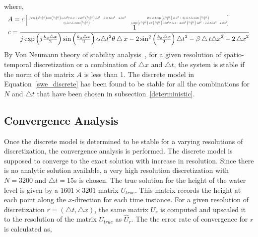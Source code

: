 \noindent where, 
\begin{equation}
\begin{array}{l} 
A = c \resizebox{.9 \textwidth}{!}  { $ \begin{bmatrix}
-j\exp\left( j \frac{k_x \bigtriangleup x}{2} \right) \sin \left( \frac{k_x \bigtriangleup x}{2} \right) \alpha {\bigtriangleup t}^{2}\theta \bigtriangleup x
+ 2 \sin^2 \left( \frac{k_x \bigtriangleup x}{2} \right) {\bigtriangleup t}^{2} - \beta \bigtriangleup t{ \bigtriangleup x}^{2} - 2\,{ \bigtriangleup x}^{2} &  
2 \theta \alpha \bigtriangleup t \exp\left( j \frac{k_x \bigtriangleup x}{2} \right) \bigtriangleup x^2 + 4j \bigtriangleup t  \bigtriangleup x  \sin \left( \frac{k_x \bigtriangleup x}{2} \right)\\
4j \bigtriangleup t  \bigtriangleup x  \sin \left( \frac{k_x \bigtriangleup x}{2} \right) & 
-j\exp\left( j \frac{k_x \bigtriangleup x}{2} \right) \sin \left( \frac{k_x \bigtriangleup x}{2} \right) \alpha {\bigtriangleup t}^{2}\theta \bigtriangleup x  +  2 \sin^2 \left( \frac{k_x \bigtriangleup x}{2} \right) {\bigtriangleup t}^{2} + \beta \bigtriangleup t{ \bigtriangleup x}^{2} - 2\,{ \bigtriangleup x}^{2}
\end{bmatrix}$  } \\
c = \displaystyle \frac{1}{j\exp\left( j \frac{k_x \bigtriangleup x}{2} \right) \sin \left( \frac{k_x \bigtriangleup x}{2} \right) \alpha {\bigtriangleup t}^{2}\theta \bigtriangleup x
-2 \sin^2 \left( \frac{k_x \bigtriangleup x}{2} \right) {\bigtriangleup t}^{2}-\beta \bigtriangleup t{ \bigtriangleup x}^{2}-2\,{ \bigtriangleup x}^{2}
} 
\end{array} 
\end{equation}
By Von Neumann theory of stability analysis~\cite{charney1950numerical}, for a given resolution of spatio-temporal discretization or a combination of  $\bigtriangleup x$ and $\bigtriangleup t$, the system is stable if the norm of the matrix $A$ is less than 1. The discrete model in Equation~\ref{swe_discrete} has been found to be stable for all the combinations for $N$ and $\bigtriangleup t$ that have been chosen in subsection~\ref{deterministic}. 

\subsection{Convergence Analysis}

Once the discrete model is determined to be stable for a varying resolutions of discretization, the convergence analysis is performed. The discrete model is supposed to converge to the exact solution with increase in resolution. Since there is no analytic solution available, a very high resolution discretization with $N = 3200$ and $\bigtriangleup t = 15$s is chosen. The true solution for the height of the water level is given by a  $1601 \times 3201$  matrix $U_{true}$. This matrix records the height at each point along the $x$-direction for each time instance.  For a given resolution of discretization $r = (\bigtriangleup t, \bigtriangleup x)$, the same matrix $U_r$ is computed and upscaled it to the resolution of the matrix $U_{true}$ as $\hat{U}_r$. The the error rate of convergence for $r$ is calculated as,

